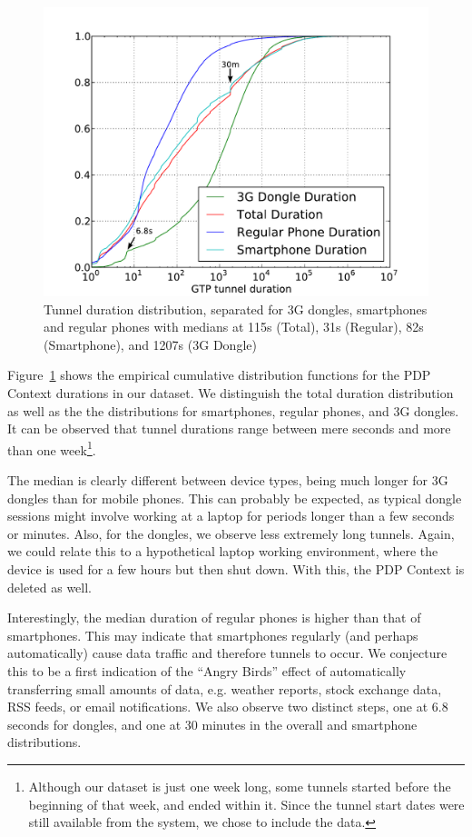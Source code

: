 \begin{figure}[htbp]
    \centering
    \includegraphics[width=\columnwidth]{images/tunnel-dur-class-cdf-mod.pdf}
    \caption{Tunnel duration distribution, separated for 3G dongles, smartphones and regular phones with medians at 115s (Total), 31s (Regular), 82s (Smartphone), and 1207s (3G Dongle)}
    \label{c4:fig:cdf-duration-device-class}
\end{figure}

Figure~\ref{c4:fig:cdf-duration-device-class} shows the empirical cumulative distribution functions for the PDP Context durations in our dataset. We distinguish the total duration distribution as well as the the distributions for smartphones, regular phones, and 3G dongles. It can be observed that tunnel durations range between mere seconds and more than one week\footnote{Although our dataset is just one week long, some tunnels started before the beginning of that week, and ended within it. Since the tunnel start dates were still available from the system, we chose to include the data.}.

The median is clearly different between device types, being much longer for 3G dongles than for mobile phones. This can probably be expected, as typical dongle sessions might involve working at a laptop for periods longer than a few seconds or minutes. Also, for the dongles, we observe less extremely long tunnels. Again, we could relate this to a hypothetical laptop working environment, where the device is used for a few hours but then shut down. With this, the PDP Context is deleted as well. 

Interestingly, the median duration of regular phones is higher than that of smartphones. This may indicate that smartphones regularly (and perhaps automatically) cause data traffic and therefore tunnels to occur. We conjecture this to be a first indication of the ``Angry Birds'' effect of automatically transferring small amounts of data, e.g. weather reports, stock exchange data, RSS feeds, or email notifications. We also observe two distinct steps, one at 6.8 seconds for dongles, and one at 30 minutes in the overall and smartphone distributions.


